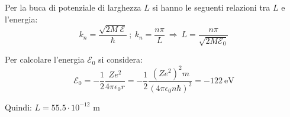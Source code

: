 \documentclass[12pt,twoside,a4]{article}
\begin{document}
 
\begin{solution}
Per la buca di potenziale di larghezza $L$ si hanno le seguenti relazioni tra $L$ e l'energia: 
\begin{equation*}
 k_n = \frac{\sqrt{2 M \ \mathcal{E}}}{\hbar} \ ;  \  k_n =  \frac{n \pi}{L}   \  \Rightarrow  \  L = \frac{n \pi}{\sqrt{2 M \mathcal{E}_0}}  
\end{equation*}
 
 \medskip
 Per calcolare l'energia $\mathcal{E}_0$ si considera: \begin{equation*}
\mathcal{E}_0 = - \frac{1 }{2} \frac{Z e^2}{4 \pi \epsilon_0 r} = - \frac{1 }{2} \frac{(Z e^2)^2 m }{(4 \pi \epsilon_0 n \hbar)^2}  = -122 \ \mathrm{eV}   
 \end{equation*}
 
 Quindi: $L = 55.5 \cdot 10^{-12}$ m
\end{solution}
\end{document}
